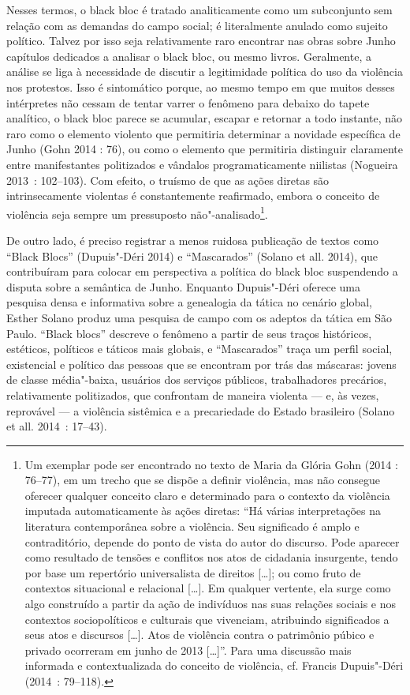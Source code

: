 Nesses termos, o black bloc é tratado
analiticamente como um subconjunto sem relação com as demandas do campo
social; é literalmente anulado como sujeito político. Talvez por isso
seja relativamente raro encontrar nas obras sobre Junho capítulos
dedicados a analisar o black bloc, ou mesmo livros. Geralmente, a
análise se liga à necessidade de discutir a legitimidade política do uso
da violência nos protestos. Isso é sintomático porque, ao mesmo tempo em
que muitos desses intérpretes não cessam de tentar varrer o fenômeno
para debaixo do tapete analítico, o black bloc parece se acumular,
escapar e retornar a todo instante, não raro como o elemento violento
que permitiria determinar a novidade específica de Junho (Gohn 2014 :
76), ou como o elemento que permitiria distinguir claramente entre
manifestantes politizados e vândalos programaticamente niilistas
(Nogueira 2013~: 102--103). Com efeito, o truísmo de que as ações diretas
são intrinsecamente violentas é constantemente reafirmado, embora o
conceito de violência seja sempre um pressuposto não"-analisado\footnote{Um
  exemplar pode ser encontrado no texto de Maria da Glória Gohn (2014 :
  76--77), em um trecho que se dispõe a definir violência, mas não
  consegue oferecer qualquer conceito claro e determinado para o
  contexto da violência imputada automaticamente às ações diretas: ``Há
  várias interpretações na literatura contemporânea sobre a violência.
  Seu significado é amplo e contraditório, depende do ponto de vista do
  autor do discurso. Pode aparecer como resultado de tensões e conflitos
  nos atos de cidadania insurgente, tendo por base um repertório
  universalista de direitos {[}\ldots{}{]}; ou como fruto de contextos
  situacional e relacional {[}\ldots{}{]}. Em qualquer vertente, ela
  surge como algo construído a partir da ação de indivíduos nas suas
  relações sociais e nos contextos sociopolíticos e culturais que
  vivenciam, atribuindo significados a seus atos e discursos
  {[}\ldots{}{]}. Atos de violência contra o patrimônio púbico e privado
  ocorreram em junho de 2013 {[}\ldots{}{]}''. Para uma discussão mais
  informada e contextualizada do conceito de violência, cf. Francis
  Dupuis"-Déri (2014~: 79--118).}.

De outro lado, é preciso registrar a menos ruidosa publicação de textos
como ``Black Blocs'' (Dupuis"-Déri 2014) e ``Mascarados'' (Solano et all.
2014), que contribuíram para colocar em perspectiva a política do black
bloc suspendendo a disputa sobre a semântica de Junho. Enquanto
Dupuis"-Déri oferece uma pesquisa densa e informativa sobre a genealogia
da tática no cenário global, Esther Solano produz uma pesquisa de campo
com os adeptos da tática em São Paulo. ``Black blocs'' descreve o
fenômeno a partir de seus traços históricos, estéticos, políticos e
táticos mais globais, e ``Mascarados'' traça um perfil social,
existencial e político das pessoas que se encontram por trás das
máscaras: jovens de classe média"-baixa, usuários dos serviços públicos,
trabalhadores precários, relativamente politizados, que confrontam de
maneira violenta --- e, às vezes, reprovável --- a violência sistêmica e a
precariedade do Estado brasileiro (Solano et all. 2014~: 17--43).

